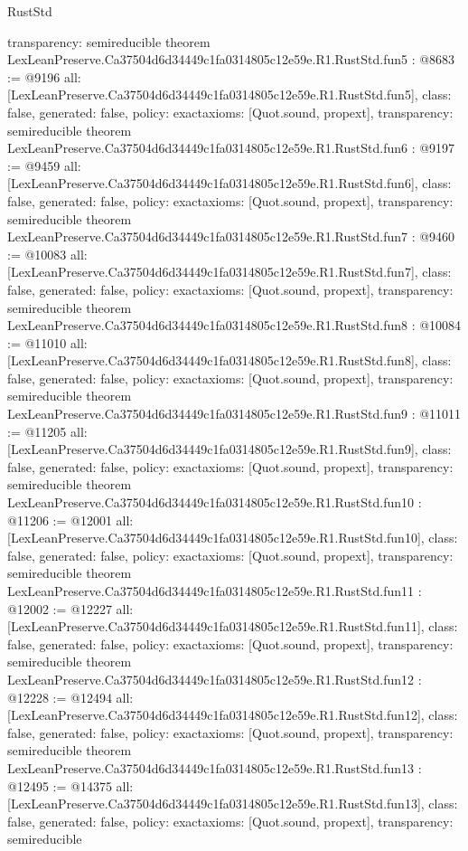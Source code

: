 \begin{lexlean}{RustStd}
\begin{coremodule}
{  transparency: semireducible
}
theorem LexLeanPreserve.Ca37504d6d34449c1fa0314805c12e59e.R1.RustStd.fun5 : @8683 := @9196 {
  all: [LexLeanPreserve.Ca37504d6d34449c1fa0314805c12e59e.R1.RustStd.fun5],
  class: false,
  generated: false,
  policy: exact{axioms: [Quot.sound, propext]},
  transparency: semireducible
}
theorem LexLeanPreserve.Ca37504d6d34449c1fa0314805c12e59e.R1.RustStd.fun6 : @9197 := @9459 {
  all: [LexLeanPreserve.Ca37504d6d34449c1fa0314805c12e59e.R1.RustStd.fun6],
  class: false,
  generated: false,
  policy: exact{axioms: [Quot.sound, propext]},
  transparency: semireducible
}
theorem LexLeanPreserve.Ca37504d6d34449c1fa0314805c12e59e.R1.RustStd.fun7 : @9460 := @10083 {
  all: [LexLeanPreserve.Ca37504d6d34449c1fa0314805c12e59e.R1.RustStd.fun7],
  class: false,
  generated: false,
  policy: exact{axioms: [Quot.sound, propext]},
  transparency: semireducible
}
theorem LexLeanPreserve.Ca37504d6d34449c1fa0314805c12e59e.R1.RustStd.fun8 : @10084 := @11010 {
  all: [LexLeanPreserve.Ca37504d6d34449c1fa0314805c12e59e.R1.RustStd.fun8],
  class: false,
  generated: false,
  policy: exact{axioms: [Quot.sound, propext]},
  transparency: semireducible
}
theorem LexLeanPreserve.Ca37504d6d34449c1fa0314805c12e59e.R1.RustStd.fun9 : @11011 := @11205 {
  all: [LexLeanPreserve.Ca37504d6d34449c1fa0314805c12e59e.R1.RustStd.fun9],
  class: false,
  generated: false,
  policy: exact{axioms: [Quot.sound, propext]},
  transparency: semireducible
}
theorem LexLeanPreserve.Ca37504d6d34449c1fa0314805c12e59e.R1.RustStd.fun10 : @11206 := @12001 {
  all: [LexLeanPreserve.Ca37504d6d34449c1fa0314805c12e59e.R1.RustStd.fun10],
  class: false,
  generated: false,
  policy: exact{axioms: [Quot.sound, propext]},
  transparency: semireducible
}
theorem LexLeanPreserve.Ca37504d6d34449c1fa0314805c12e59e.R1.RustStd.fun11 : @12002 := @12227 {
  all: [LexLeanPreserve.Ca37504d6d34449c1fa0314805c12e59e.R1.RustStd.fun11],
  class: false,
  generated: false,
  policy: exact{axioms: [Quot.sound, propext]},
  transparency: semireducible
}
theorem LexLeanPreserve.Ca37504d6d34449c1fa0314805c12e59e.R1.RustStd.fun12 : @12228 := @12494 {
  all: [LexLeanPreserve.Ca37504d6d34449c1fa0314805c12e59e.R1.RustStd.fun12],
  class: false,
  generated: false,
  policy: exact{axioms: [Quot.sound, propext]},
  transparency: semireducible
}
theorem LexLeanPreserve.Ca37504d6d34449c1fa0314805c12e59e.R1.RustStd.fun13 : @12495 := @14375 {
  all: [LexLeanPreserve.Ca37504d6d34449c1fa0314805c12e59e.R1.RustStd.fun13],
  class: false,
  generated: false,
  policy: exact{axioms: [Quot.sound, propext]},
  transparency: semireducible
}
\end{coremodule}
\end{lexlean}
